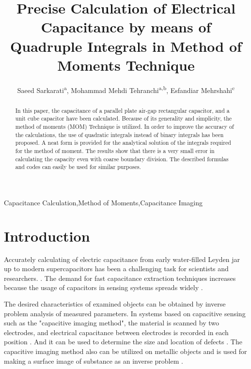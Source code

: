 \documentclass[final,5p,times,twocolumn]{elsarticle}
\begin{document}
\begin{frontmatter}

\title{Precise Calculation of Electrical Capacitance by means of Quadruple Integrals in  Method of Moments Technique}



\author{Saeed Sarkarati\textsuperscript{a}, Mohammad Mehdi Tehranchi\textsuperscript{a,b}, Esfandiar Mehrshahi\textsuperscript{c}}
\address{\textsuperscript{a}Laser and Plasma Research Institute, Shahid Beheshti University, Tehran, Iran}
\address{\textsuperscript{b}Department of Physics , Shahid Beheshti University, Tehran, Iran}
\address{\textsuperscript{c}Department of Electrical Engineering, Shahid Beheshti University, Tehran, Iran}




\begin{abstract}
In this paper, the capacitance of a parallel plate air-gap rectangular capacitor, and a unit cube capacitor have been calculated. Because of its generality and simplicity, the method of moments (MOM) Technique is utilized. In order to improve the accuracy of the calculations, the use of quadratic integrals instead of binary integrals has been proposed. A neat form is provided for the analytical solution of the integrals required for the method of moment. The results show that there is a very small error in calculating the capacity even with coarse boundary division. The described formulas and codes can easily be used for similar purposes.
\end{abstract}

\begin{keyword}
Capacitance Calculation\sep Method of Moments\sep Capacitance Imaging

\end{keyword}

\end{frontmatter}


\section{Introduction}
Accurately calculating of electric capacitance from early water-filled Leyden jar up to modern supercapacitors has been a challenging task for scientists and researchers. \cite{Dubal2016}. The demand for fast capacitance extraction techniques increases because the usage of capacitors in sensing systems spreads widely \cite{Rahman2009}.

The desired characteristics of examined objects can be obtained by inverse problem analysis of measured parameters. In systems based on capacitive sensing such as the "capacitive imaging method", the material is scanned by two electrodes, and electrical capacitance between electrodes is recorded in each position \cite{Diamond2006, Ma2020}. And it can be used to determine the size and location of defects \cite{Liu2017}. The capacitive imaging method also can be utilized on metallic objects and is used for making a surface image of substance as an inverse problem \cite{Muttakin2018}.
\end{document}
